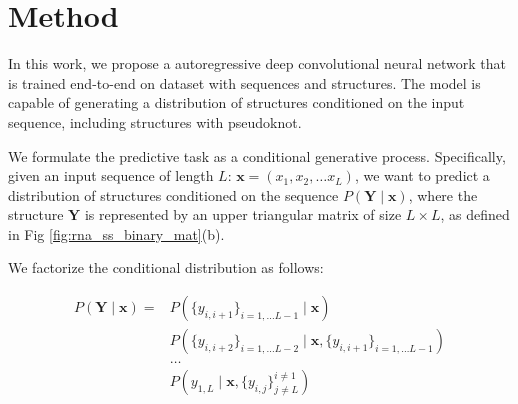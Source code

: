 \documentclass{article}
\begin{document}
\section{Method}


In this work, we propose a autoregressive deep convolutional neural network that is trained end-to-end on
dataset with sequences and structures.
The model is capable of generating a distribution of structures conditioned on the input sequence,
including structures with pseudoknot.



We formulate the predictive task as a conditional generative process.
Specifically, given an input sequence of length $L$: $\bm{x} = (x_1, x_2, \dots x_{L})$,
we want to predict a distribution of structures conditioned on the sequence $P(\bm{Y} \mid \bm{x})$,
where the structure $\bm{Y}$ is represented by an upper triangular matrix of size $L \times L$, as defined in Fig \ref{fig:rna_ss_binary_mat}(b).


We factorize the conditional distribution as follows:



\begin{equation}
    \label{eq:conditional_distribution}
    \begin{split}
        P(\bm{Y} \mid \bm{x}) =& P(\{y_{i, i+1}\}_{i=1, \dots L-1} \mid \bm{x}) \\
        & P(\{y_{i, i+2}\}_{i=1, \dots L-2} \mid \bm{x}, \{y_{i, i+1}\}_{i=1, \dots L-1}) \\
        & \dots \\
        & P(y_{1, L} \mid \bm{x}, \{y_{i, j}\}^{i \neq 1}_{j \neq L})
    \end{split}
\end{equation}

\end{document}
